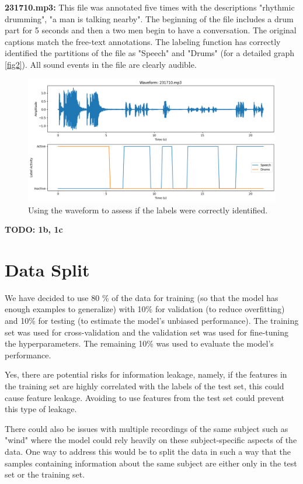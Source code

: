 \documentclass{article}
\begin{document}
\textbf{231710.mp3:}
This file was annotated five times with the descriptions "rhythmic drumming", "a man is talking nearby". The beginning of the file includes a drum part for 5 seconds and then a two men begin to have a conversation. The original captions match the free-text annotations. The labeling function has correctly identified the partitions of the file as "Speech" and "Drums" (for a detailed graph \autoref{fig2}). All sound events in the file are clearly audible.

\begin{figure}[H]
  \centering
  \includegraphics[width=0.75\linewidth]{output2.png}
  \caption{Using the waveform to assess if the labels were correctly identified.}
  \label{fig2}
\end{figure}

\textbf{TODO: 1b, 1c}

\section{Data Split}
\label{sec:data_split}
We have decided to use 80 \% of the data for training (so that the model has enough examples to generalize) with 10\% for validation (to reduce overfitting) and 10\% for testing (to estimate the model's unbiased performance). The training set was used for cross-validation and the validation set was used for fine-tuning the hyperparameters. The remaining 10\% was used to evaluate the model's performance.

Yes, there are potential risks for information leakage, namely, if the features in the training set are highly correlated with the labels of the test set, this could cause feature leakage. Avoiding to use features from the test set could prevent this type of leakage. 

There could also be issues with multiple recordings of the same subject such as "wind" where the model could rely heavily on these subject-specific aspects of the data. One way to address this would be to split the data in such a way that the samples containing information about the same subject are either only in the test set or the training set. 
\end{document}
